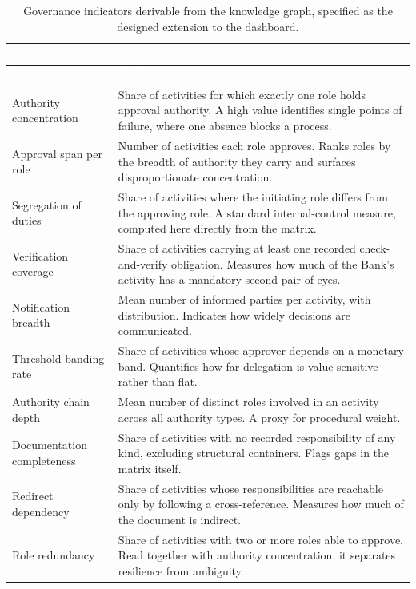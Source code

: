 \begin{longtable}{|p{}|p{}|}
\caption{Governance indicators derivable from the knowledge graph, specified as the designed extension to the dashboard.}\label{tab:govkpi}\\
\hline
\rowcolor{myblue}\textcolor{white}{\textbf{Indicator}} & \textcolor{white}{\textbf{Definition and interpretation}} \\
\hline
\endfirsthead
\hline
\rowcolor{myblue}\textcolor{white}{\textbf{Indicator}} & \textcolor{white}{\textbf{Definition and interpretation}} \\
\hline
\endhead
Authority concentration & Share of activities for which exactly one role holds approval authority. A high value identifies single points of failure, where one absence blocks a process. \\ \hline
Approval span per role & Number of activities each role approves. Ranks roles by the breadth of authority they carry and surfaces disproportionate concentration. \\ \hline
Segregation of duties & Share of activities where the initiating role differs from the approving role. A standard internal-control measure\citep{coso2013}, computed here directly from the matrix. \\ \hline
Verification coverage & Share of activities carrying at least one recorded check-and-verify obligation. Measures how much of the Bank's activity has a mandatory second pair of eyes. \\ \hline
Notification breadth & Mean number of informed parties per activity, with distribution. Indicates how widely decisions are communicated. \\ \hline
Threshold banding rate & Share of activities whose approver depends on a monetary band. Quantifies how far delegation is value-sensitive rather than flat. \\ \hline
Authority chain depth & Mean number of distinct roles involved in an activity across all authority types. A proxy for procedural weight. \\ \hline
Documentation completeness & Share of activities with no recorded responsibility of any kind, excluding structural containers. Flags gaps in the matrix itself. \\ \hline
Redirect dependency & Share of activities whose responsibilities are reachable only by following a cross-reference. Measures how much of the document is indirect. \\ \hline
Role redundancy & Share of activities with two or more roles able to approve. Read together with authority concentration, it separates resilience from ambiguity. \\ \hline
\end{longtable}

